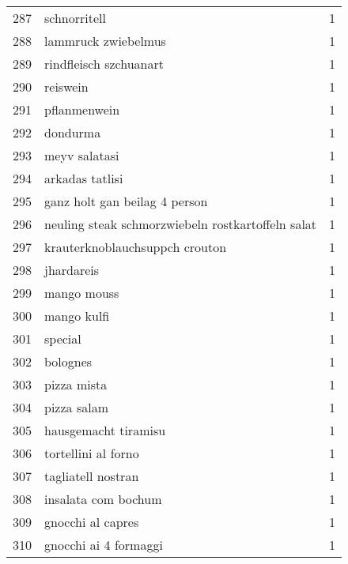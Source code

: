 \begin{tabular}{llr}
287 &                                       schnorritell &      1 \\
288 &                                lammruck zwiebelmus &      1 \\
289 &                             rindfleisch szchuanart &      1 \\
290 &                                           reiswein &      1 \\
291 &                                       pflanmenwein &      1 \\
292 &                                           dondurma &      1 \\
293 &                                      meyv salatasi &      1 \\
294 &                                    arkadas tatlisi &      1 \\
295 &                      ganz holt gan beilag 4 person &      1 \\
296 &  neuling steak schmorzwiebeln rostkartoffeln salat &      1 \\
297 &                     krauterknoblauchsuppch crouton &      1 \\
298 &                                         jhardareis &      1 \\
299 &                                        mango mouss &      1 \\
300 &                                        mango kulfi &      1 \\
301 &                                            special &      1 \\
302 &                                           bolognes &      1 \\
303 &                                        pizza mista &      1 \\
304 &                                        pizza salam &      1 \\
305 &                               hausgemacht tiramisu &      1 \\
306 &                                tortellini al forno &      1 \\
307 &                                 tagliatell nostran &      1 \\
308 &                                insalata com bochum &      1 \\
309 &                                  gnocchi al capres &      1 \\
310 &                              gnocchi ai 4 formaggi &      1 \\

\end{tabular}
